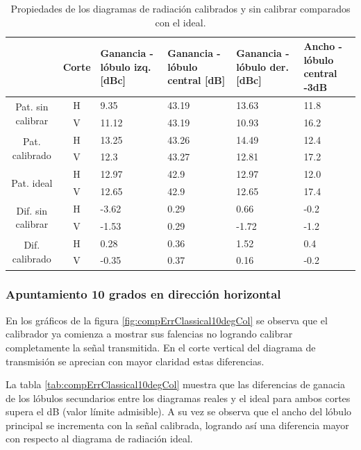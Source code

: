 \begin{table}[H]
  \footnotesize
  \centering
  \begin{tabular}{|c|c|p{2cm}|p{2.5cm}|p{2.5cm}|p{2.5cm}|}
    \cline{2-6}
    \multicolumn{1}{c|}{} & Corte & Ganancia - lóbulo izq. [dBc] & Ganancia - lóbulo central [dB] &
    Ganancia - lóbulo der. [dBc] & Ancho - lóbulo central -3dB \tabularnewline\hline
    \multirow{2}{2cm}{Pat. sin calibrar} & H & 9.35 & 43.19 & 13.63 & 11.8 \tabularnewline\cline{2-6}
     & V & 11.12 & 43.19 & 10.93 & 16.2 \tabularnewline\hline
    \multirow{2}{2cm}{Pat. calibrado} & H & 13.25 & 43.26 & 14.49 & 12.4 \tabularnewline\cline{2-6}
     & V & 12.3 & 43.27 & 12.81 & 17.2 \tabularnewline\hline
    \multirow{2}{2cm}{Pat. ideal} & H & 12.97 & 42.9 & 12.97 & 12.0 \tabularnewline\cline{2-6}
     & V & 12.65 & 42.9 & 12.65 & 17.4 \tabularnewline\hline
    \multirow{2}{2cm}{Dif. sin calibrar} & H & -3.62 & 0.29 & 0.66 & -0.2\tabularnewline\cline{2-6}
     & V & -1.53 & 0.29 & -1.72 & -1.2 \tabularnewline\hline
    \multirow{2}{2cm}{Dif. calibrado} & H & 0.28 & 0.36 & 1.52 & 0.4 \tabularnewline\cline{2-6}
     & V & -0.35 & 0.37 & 0.16 & -0.2 \tabularnewline\hline
  \end{tabular}
  \caption{Propiedades de los diagramas de radiación calibrados y sin calibrar comparados con el ideal.}
  \label{tab:compErrClassical0deg}
\end{table}


\subsubsection{Apuntamiento 10 grados en dirección horizontal}

En los gráficos de la figura \ref{fig:compErrClassical10degCol} se observa que el calibrador ya comienza a mostrar sus falencias no 
logrando calibrar completamente la señal transmitida. En el corte vertical del diagrama de transmisión se aprecian con mayor 
claridad estas diferencias.

La tabla \ref{tab:compErrClassical10degCol} muestra que las diferencias de ganacia de los lóbulos secundarios entre los diagramas 
reales y el ideal para ambos cortes supera el dB (valor límite admisible). A su vez se observa que el ancho del lóbulo 
principal se incrementa con la señal calibrada, logrando así una diferencia mayor con respecto al diagrama de radiación ideal.

